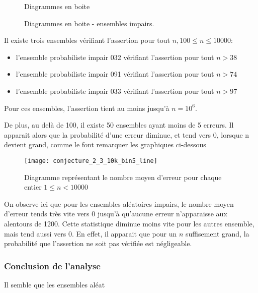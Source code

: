 \documentclass[../main.text]{report}
\begin{document}
\begin{figure}[H]
\centering
	\caption{Diagrammes en boite}
	\label{fig:boxplots}
\end{figure}

\begin{figure}[H]
\centering
	\caption{Diagrammes en boite - ensembles impairs.}
	\label{fig:boxplots_Odd}
\end{figure}

Il existe trois ensembles vérifiant l'assertion pour tout $n, 100 \leq n \leq 10000$:
\begin{itemize}
	\item l'ensemble probabiliste impair 032 vérifiant l'assertion pour tout $n > 38$
	\item l'ensemble probabiliste impair 091 vérifiant l'assertion pour tout $n > 74$
	\item l'ensemble probabiliste impair 033 vérifiant l'assertion pour tout $n > 97$
\end{itemize}
Pour ces ensembles, l'assertion tient au moins jusqu'à $n=10^6$.  

De plus, au delà de 100, il existe 50 ensembles ayant moins de 5 erreurs. 
Il apparait alors que la probabilité d'une erreur diminue, et tend vers 0, lorsque n devient grand, comme le font remarquer les graphiques ci-dessous
\begin{figure}[H]
\centering
\texttt{[image: conjecture\_2\_3\_10k\_bin5\_line]}
\caption{Diagramme représentant le nombre moyen d'erreur pour chaque entier $1 \leq n < 10000$}
\label{fig:conjecture_2_3_10k_bin5_line}
\end{figure}

On observe ici que pour les ensembles aléatoires impairs, le nombre moyen d'erreur tends très vite vers 0 jusqu'à qu'aucune erreur n'apparaisse aux alentours de 1200. Cette statistique diminue moins vite pour les autres ensemble, mais tend aussi vers 0.
En effet, il apparait que pour un $n$ suffisement grand, la probabilité que l'assertion ne soit pas vérifiée est négligeable. 

\subsubsection{Conclusion de l'analyse}
Il semble que les ensembles aléat
\end{document}
